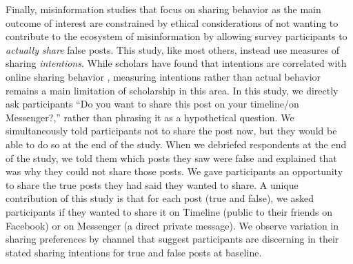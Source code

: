 \documentclass[letterpaper, 12pt, parskip=full,DIV=10]{scrartcl}
\begin{document}
Finally, misinformation studies that focus on sharing behavior as the main outcome of interest are constrained by ethical considerations of not wanting to contribute to the ecosystem of misinformation by allowing survey participants to \textit{actually share} false posts. This study,  like most others, instead use measures of sharing \textit{intentions}.  While scholars have found that intentions are correlated with online sharing behavior \citep{mosleh2020self}, measuring intentions rather than actual behavior remains a main limitation of scholarship in this area.  In this study, we directly ask participants ``Do you want to share this post on your timeline/on Messenger?,'' rather than phrasing it as a hypothetical question. We simultaneously told participants not to share the post now, but they would be able to do so at the end of the study. When we debriefed respondents at the end of the study, we told them which posts they saw were false and explained that was why they could not share those posts. We gave participants an opportunity to share the true posts they had said they wanted to share.  A unique contribution of this study is that for each post (true and false), we asked participants if they wanted to share it on Timeline (public to their friends on Facebook) or on Messenger (a direct private message). We observe variation in sharing preferences by channel that suggest participants are discerning in their stated sharing intentions for true and false posts at baseline. 






\end{document}
